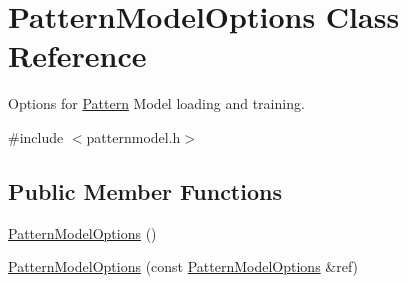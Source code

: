 \hypertarget{classPatternModelOptions}{}\section{Pattern\+Model\+Options Class Reference}
\label{classPatternModelOptions}


Options for \hyperlink{classPattern}{Pattern} Model loading and training.  




{\ttfamily \#include $<$patternmodel.\+h$>$}

\subsection*{Public Member Functions}
\begin{DoxyCompactItemize}
\item 
\hyperlink{classPatternModelOptions_a32b803262231539a8cd3d715dea7ee81}{Pattern\+Model\+Options} ()
\item 
\hyperlink{classPatternModelOptions_a4166fddbf1270f94c60d1c5f391972a9}{Pattern\+Model\+Options} (const \hyperlink{classPatternModelOptions}{Pattern\+Model\+Options} \&ref)
\end{DoxyCompactItemize}
